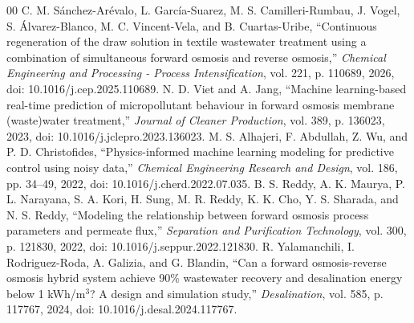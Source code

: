 \documentclass[journal, onecolumn, 12pt]{IEEEtran}
\begin{document}
\begin{thebibliography}{00}
 C. M. S\'anchez-Ar\'evalo, L. Garc\'ia-Suarez, M. S. Camilleri-Rumbau, J. Vogel, S. \'Alvarez-Blanco, M. C. Vincent-Vela, and B. Cuartas-Uribe, ``Continuous regeneration of the draw solution in textile wastewater treatment using a combination of simultaneous forward osmosis and reverse osmosis,'' \textit{Chemical Engineering and Processing - Process Intensification}, vol. 221, p. 110689, 2026, doi: 10.1016/j.cep.2025.110689.
 N. D. Viet and A. Jang, ``Machine learning-based real-time prediction of micropollutant behaviour in forward osmosis membrane (waste)water treatment,'' \textit{Journal of Cleaner Production}, vol. 389, p. 136023, 2023, doi: 10.1016/j.jclepro.2023.136023.
 M. S. Alhajeri, F. Abdullah, Z. Wu, and P. D. Christofides, ``Physics-informed machine learning modeling for predictive control using noisy data,'' \textit{Chemical Engineering Research and Design}, vol. 186, pp. 34--49, 2022, doi: 10.1016/j.cherd.2022.07.035.
 B. S. Reddy, A. K. Maurya, P. L. Narayana, S. A. Kori, H. Sung, M. R. Reddy, K. K. Cho, Y. S. Sharada, and N. S. Reddy, ``Modeling the relationship between forward osmosis process parameters and permeate flux,'' \textit{Separation and Purification Technology}, vol. 300, p. 121830, 2022, doi: 10.1016/j.seppur.2022.121830.
 R. Yalamanchili, I. Rodriguez-Roda, A. Galizia, and G. Blandin, ``Can a forward osmosis-reverse osmosis hybrid system achieve 90\% wastewater recovery and desalination energy below 1 kWh/m$^3$? A design and simulation study,'' \textit{Desalination}, vol. 585, p. 117767, 2024, doi: 10.1016/j.desal.2024.117767.
\end{thebibliography}
\end{document}
